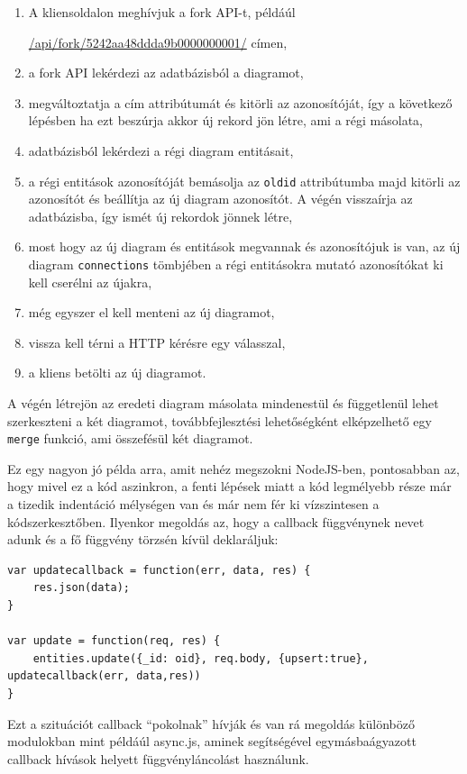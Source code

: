 \begin{enumerate}
\item A kliensoldalon meghívjuk a fork API-t, példáúl 

\url{/api/fork/5242aa48ddda9b0000000001/} címen,
\item a fork API lekérdezi az adatbázisból a diagramot,
\item megváltoztatja a cím  attribútumát és kitörli az azonosítóját, így a következő lépésben ha ezt beszúrja akkor új rekord jön létre, ami a régi másolata,
\item adatbázisból lekérdezi a régi diagram entitásait, 
\item a régi entitások azonosítóját bemásolja az \lstinline{oldid} attribútumba majd kitörli az azonosítót és beállítja az új diagram azonosítót. A végén visszaírja az adatbázisba, így ismét új rekordok jönnek létre,
\item most hogy az új diagram és entitások megvannak és azonosítójuk is van, az új diagram \lstinline{connections} tömbjében a régi entitásokra mutató azonosítókat ki kell cserélni az újakra,
\item még egyszer el kell menteni az új diagramot,
\item vissza kell térni a HTTP kérésre egy válasszal,
\item a kliens betölti az új diagramot.
\end{enumerate}


A végén létrejön az eredeti diagram másolata mindenestül és függetlenül lehet szerkeszteni a két diagramot, továbbfejlesztési lehetőségként elképzelhető egy \lstinline{merge} funkció, ami összefésül két diagramot. 

Ez egy nagyon jó példa arra, amit nehéz megszokni NodeJS-ben, pontosabban az, hogy mivel ez a kód aszinkron, a fenti lépések miatt a kód legmélyebb része már a tizedik indentáció mélységen van és már nem fér ki vízszintesen a kódszerkesztőben. Ilyenkor megoldás az, hogy a callback függvénynek nevet adunk és a fő függvény törzsén kívül deklaráljuk:

\begin{lstlisting}[caption=A \emph{callback pokol} elkerülése]
var updatecallback = function(err, data, res) {
    res.json(data);
}

var update = function(req, res) {
    entities.update({_id: oid}, req.body, {upsert:true}, updatecallback(err, data,res))
}
\end{lstlisting}

Ezt a szituációt callback ``pokolnak'' hívják és van rá megoldás különböző modulokban mint példáúl async.js, aminek segítségével egymásbaágyazott callback hívások helyett függvényláncolást használunk.

